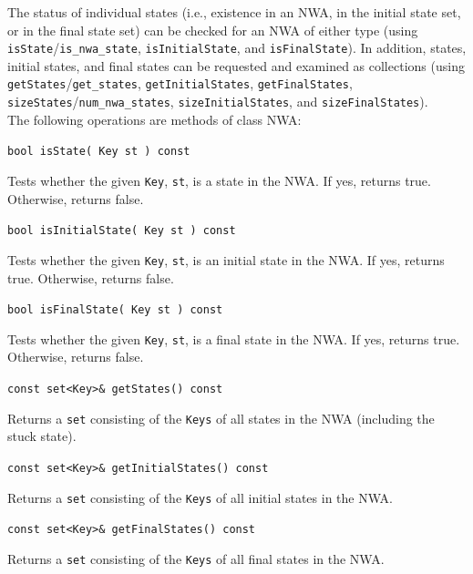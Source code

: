 \documentclass{llncs}
\begin{document}
The status of individual states (i.e., existence in an NWA, in the initial
state set, or in the final state set) can be checked for an NWA of either
type (using \texttt{isState}/\texttt{is\_nwa\_state},
\texttt{isInitialState}, and \texttt{isFinalState}).  In addition, states,
initial states, and final states can be requested and examined as collections
(using \texttt{getStates}/\texttt{get\_states}, \texttt{getInitialStates},
\texttt{getFinalStates}, \texttt{sizeStates}/\texttt{num\_nwa\_states},
\texttt{sizeInitialStates}, and \texttt{sizeFinalStates}). \\

\noindent The following operations are methods of class NWA:

\begin{description}

  \item\texttt{bool isState( Key st ) const} \nopagebreak

    Tests whether the given \texttt{Key}, \texttt{st}, is a state in the NWA.
    If yes, returns true.  Otherwise, returns false.

  \item\texttt{bool isInitialState( Key st ) const} \nopagebreak

    Tests whether the given \texttt{Key}, \texttt{st}, is an initial state in
    the NWA.  If yes, returns true.  Otherwise, returns false.

  \item\texttt{bool isFinalState( Key st ) const} \nopagebreak

    Tests whether the given \texttt{Key}, \texttt{st}, is a final state in
    the NWA.  If yes, returns true.  Otherwise, returns false.

  \item\texttt{const set<Key>\& getStates() const} \nopagebreak

    Returns a \texttt{set} consisting of the \texttt{Keys} of all states in
    the NWA (including the stuck state).

  \item\texttt{const set<Key>\& getInitialStates() const} \nopagebreak

    Returns a \texttt{set} consisting of the \texttt{Keys} of all initial
    states in the NWA.

  \item\texttt{const set<Key>\& getFinalStates() const} \nopagebreak

    Returns a \texttt{set} consisting of the \texttt{Keys} of all final
    states in the NWA.


\end{description}
\end{document}
